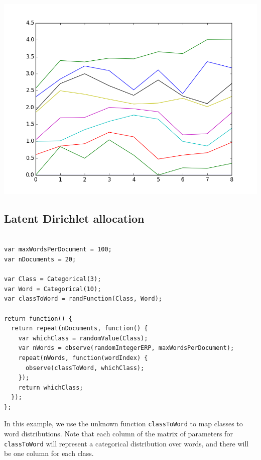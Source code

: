 \documentclass{article}
\begin{document}
\begin{center}
  \includegraphics[scale=0.5]{../plots/accuracy_hmm.png}
\end{center}

\subsection{Latent Dirichlet allocation}
{\small
\begin{lstlisting}

var maxWordsPerDocument = 100;
var nDocuments = 20;

var Class = Categorical(3);
var Word = Categorical(10);
var classToWord = randFunction(Class, Word);

return function() {
  return repeat(nDocuments, function() {
    var whichClass = randomValue(Class);
    var nWords = observe(randomIntegerERP, maxWordsPerDocument);
    repeat(nWords, function(wordIndex) {
      observe(classToWord, whichClass);
    });
    return whichClass;
  });
};

\end{lstlisting}
}

In this example, we use the unknown function \texttt{classToWord} to map classes to word distributions.  Note that each column of the matrix of parameters for \texttt{classToWord} will represent a categorical distribution over words, and there will be one column for each class.
\end{document}

